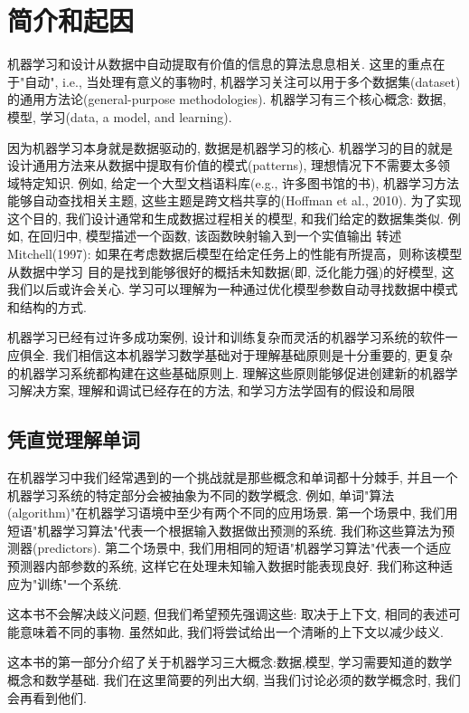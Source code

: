 \chapter{简介和起因}

机器学习和设计从数据中自动提取有价值的信息的算法息息相关.
这里的重点在于"自动", 
i.e., 当处理有意义的事物时, 机器学习关注可以用于多个数据集(dataset)的通用方法论(general-purpose methodologies).
机器学习有三个核心概念: 数据, 模型, 学习(data, a model, and learning).

因为机器学习本身就是数据驱动的, 数据是机器学习的核心.
机器学习的目的就是设计通用方法来从数据中提取有价值的模式(patterns), 理想情况下不需要太多领域特定知识.
例如, 给定一个大型文档语料库(e.g., 许多图书馆的书), 机器学习方法能够自动查找相关主题, 这些主题是跨文档共享的(Hoffman et al., 2010).
为了实现这个目的, 我们设计通常和生成数据过程相关的模型, 和我们给定的数据集类似.
例如, 在回归中, 模型描述一个函数, 该函数映射输入到一个实值输出
转述Mitchell(1997): 如果在考虑数据后模型在给定任务上的性能有所提高，则称该模型从数据中学习
目的是找到能够很好的概括未知数据(即, 泛化能力强)的好模型, 这我们以后或许会关心.
学习可以理解为一种通过优化模型参数自动寻找数据中模式和结构的方式.

机器学习已经有过许多成功案例, 设计和训练复杂而灵活的机器学习系统的软件一应俱全.
我们相信这本机器学习数学基础对于理解基础原则是十分重要的, 更复杂的机器学习系统都构建在这些基础原则上.
理解这些原则能够促进创建新的机器学习解决方案, 理解和调试已经存在的方法, 和学习方法学固有的假设和局限

\section{凭直觉理解单词}
在机器学习中我们经常遇到的一个挑战就是那些概念和单词都十分棘手, 
并且一个机器学习系统的特定部分会被抽象为不同的数学概念.
例如, 单词"算法(algorithm)"在机器学习语境中至少有两个不同的应用场景.
第一个场景中, 我们用短语"机器学习算法"代表一个根据输入数据做出预测的系统.
我们称这些算法为预测器(predictors).
第二个场景中, 我们用相同的短语"机器学习算法"代表一个适应预测器内部参数的系统, 这样它在处理未知输入数据时能表现良好.
我们称这种适应为"训练"一个系统.

这本书不会解决歧义问题, 但我们希望预先强调这些: 取决于上下文, 相同的表述可能意味着不同的事物.
虽然如此, 我们将尝试给出一个清晰的上下文以减少歧义.

这本书的第一部分介绍了关于机器学习三大概念:数据,模型, 学习需要知道的数学概念和数学基础.
我们在这里简要的列出大纲, 当我们讨论必须的数学概念时, 我们会再看到他们.

